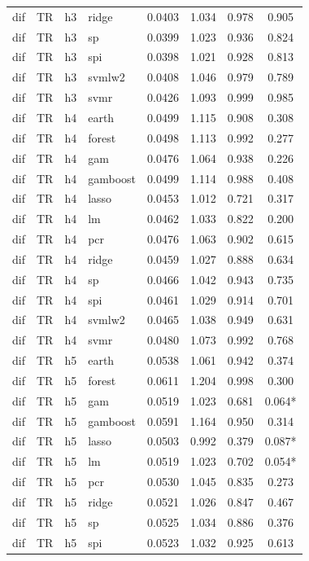 \begin{ThreePartTable}
\begin{longtable}[t]{llclcccc}
dif & TR & h3 & ridge & 0.0403 & 1.034 & 0.978 & 0.905\\
dif & TR & h3 & sp & 0.0399 & 1.023 & 0.936 & 0.824\\
dif & TR & h3 & spi & 0.0398 & 1.021 & 0.928 & 0.813\\
dif & TR & h3 & svmlw2 & 0.0408 & 1.046 & 0.979 & 0.789\\
dif & TR & h3 & svmr & 0.0426 & 1.093 & 0.999 & 0.985\\
\addlinespace
dif & TR & h4 & earth & 0.0499 & 1.115 & 0.908 & 0.308\\
dif & TR & h4 & forest & 0.0498 & 1.113 & 0.992 & 0.277\\
dif & TR & h4 & gam & 0.0476 & 1.064 & 0.938 & 0.226\\
dif & TR & h4 & gamboost & 0.0499 & 1.114 & 0.988 & 0.408\\
dif & TR & h4 & lasso & 0.0453 & 1.012 & 0.721 & 0.317\\
dif & TR & h4 & lm & 0.0462 & 1.033 & 0.822 & 0.200\\
dif & TR & h4 & pcr & 0.0476 & 1.063 & 0.902 & 0.615\\
dif & TR & h4 & ridge & 0.0459 & 1.027 & 0.888 & 0.634\\
dif & TR & h4 & sp & 0.0466 & 1.042 & 0.943 & 0.735\\
dif & TR & h4 & spi & 0.0461 & 1.029 & 0.914 & 0.701\\
dif & TR & h4 & svmlw2 & 0.0465 & 1.038 & 0.949 & 0.631\\
dif & TR & h4 & svmr & 0.0480 & 1.073 & 0.992 & 0.768\\
\addlinespace
dif & TR & h5 & earth & 0.0538 & 1.061 & 0.942 & 0.374\\
dif & TR & h5 & forest & 0.0611 & 1.204 & 0.998 & 0.300\\
dif & TR & h5 & gam & 0.0519 & 1.023 & 0.681 & 0.064*\\
dif & TR & h5 & gamboost & 0.0591 & 1.164 & 0.950 & 0.314\\
dif & TR & h5 & lasso & 0.0503 & 0.992 & 0.379 & 0.087*\\
dif & TR & h5 & lm & 0.0519 & 1.023 & 0.702 & 0.054*\\
dif & TR & h5 & pcr & 0.0530 & 1.045 & 0.835 & 0.273\\
dif & TR & h5 & ridge & 0.0521 & 1.026 & 0.847 & 0.467\\
dif & TR & h5 & sp & 0.0525 & 1.034 & 0.886 & 0.376\\
dif & TR & h5 & spi & 0.0523 & 1.032 & 0.925 & 0.613\\

\end{longtable}
\end{ThreePartTable}
